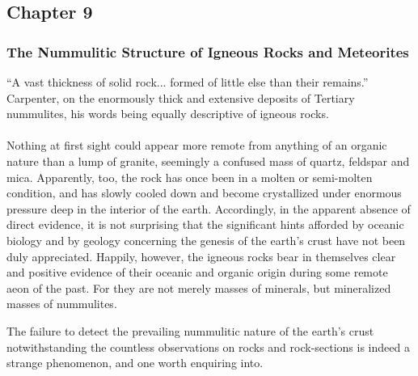 \documentclass[a4paper, 12pt, oneside]{article}
\begin{document}
\subsection{Chapter 9}
\subsubsection{The Nummulitic Structure of Igneous Rocks and Meteorites}
\begin{displayquote}
``A vast thickness of solid rock... formed of little else than their remains.'' Carpenter, on the enormously thick and extensive deposits of Tertiary nummulites, his words being equally descriptive of igneous rocks.
\end{displayquote}
\paragraph{}
Nothing at first sight could appear more remote from anything of an organic nature than a lump of granite, seemingly a confused mass of quartz, feldspar and mica. Apparently, too, the rock has once been in a molten or semi-molten condition, and has slowly cooled down and become crystallized under enormous pressure deep in the interior of the earth. Accordingly, in the apparent absence of direct evidence, it is not surprising that the significant hints afforded by oceanic biology and by geology concerning the genesis of the earth's crust have not been duly appreciated. Happily, however, the igneous rocks bear in themselves clear and positive evidence of their oceanic and organic origin during some remote aeon of the past. For they are not merely masses of minerals, but mineralized masses of nummulites.

The failure to detect the prevailing nummulitic nature of the earth's crust notwithstanding the countless observations on rocks and rock-sections is indeed a strange phenomenon, and one worth enquiring into.
\end{document}
